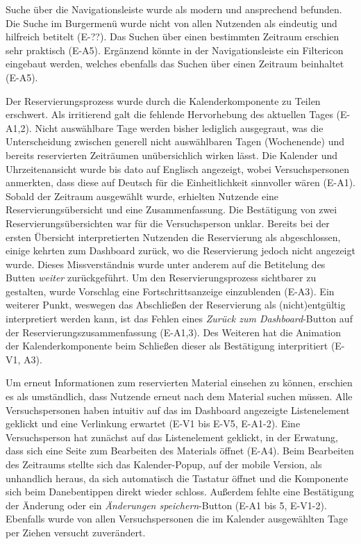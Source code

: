 Suche über die Navigationsleiste wurde als modern und ansprechend befunden. Die
Suche im Burgermenü wurde nicht von allen Nutzenden als eindeutig und hilfreich
betitelt (E-??). Das Suchen über einen bestimmten Zeitraum erschien sehr praktisch
(E-A5). Ergänzend könnte in der Navigationsleiste ein Filtericon eingebaut
werden, welches ebenfalls das Suchen über einen Zeitraum beinhaltet (E-A5).

Der Reservierungsprozess wurde durch die Kalenderkomponente zu Teilen erschwert. Als irritierend
galt die fehlende Hervorhebung des aktuellen Tages (E-A1,2). Nicht auswählbare Tage werden bisher
lediglich ausgegraut, was die Unterscheidung zwischen generell nicht auswählbaren Tagen (Wochenende)
und bereits reservierten Zeiträumen unübersichlich wirken lässt. Die Kalender und Uhrzeitenansicht
wurde bis dato auf Englisch angezeigt, wobei Versuchspersonen anmerkten, dass diese auf Deutsch für
die Einheitlichkeit sinnvoller wären (E-A1). Sobald der Zeitraum ausgewählt wurde, erhielten
Nutzende eine Reservierungsübersicht und eine Zusammenfassung. Die Bestätigung von zwei
Reservierungsübersichten war für die Versuchsperson unklar. Bereits bei der ersten Übersicht
interpretierten Nutzenden die Reservierung als abgeschlossen, einige kehrten zum Dashboard zurück,
wo die Reservierung jedoch nicht angezeigt wurde. Dieses Missverständnis wurde unter anderem auf die
Betitelung des Butten \textit{weiter} zurückgeführt. Um den Reservierungsprozess sichtbarer zu
gestalten, wurde Vorschlag eine Fortschrittsanzeige einzublenden (E-A3). Ein weiterer Punkt,
weswegen das Abschließen der Reservierung als (nicht)entgültig interpretiert werden kann, ist das
Fehlen eines \textit{Zurück zum Dashboard}-Button auf der Reservierungszusammenfassung (E-A1,3). Des
Weiteren hat die Animation der Kalenderkomponente beim Schließen dieser als Bestätigung
interpritiert (E-V1, A3).

Um erneut Informationen zum reservierten Material einsehen zu können, erschien es
als umständlich, dass Nutzende erneut nach dem Material suchen müssen. Alle
Versuchspersonen haben intuitiv auf das im Dashboard angezeigte Listenelement
geklickt und eine Verlinkung erwartet (E-V1 bis E-V5, E-A1-2). Eine
Versuchsperson hat zunächst auf das Listenelement geklickt, in der Erwatung,
dass sich eine Seite zum Bearbeiten des Materials öffnet (E-A4). Beim Bearbeiten
des Zeitraums stellte sich das Kalender-Popup, auf der mobile Version, als
unhandlich heraus, da sich automatisch die Tastatur öffnet und die Komponente
sich beim Danebentippen direkt wieder schloss. Außerdem fehlte eine Bestätigung
der Änderung oder ein \textit{Änderungen speichern}-Button (E-A1 bis 5, E-V1-2).
Ebenfalls wurde von allen Versuchspersonen die im Kalender ausgewählten Tage per
Ziehen versucht zuverändert.

